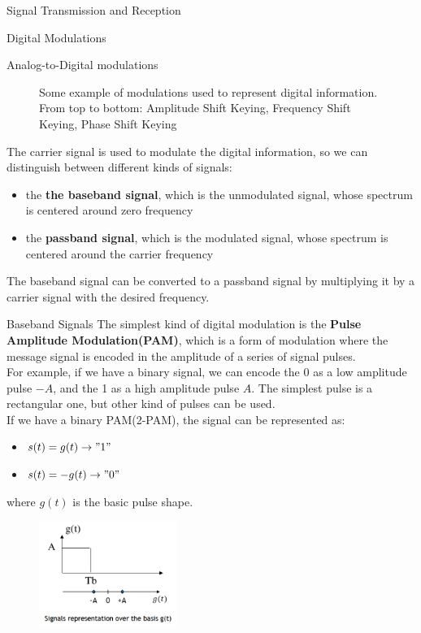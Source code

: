 \begin{section}{Signal Transmission and Reception}
\begin{subsection}{Digital Modulations}
\begin{subsubsection}{Analog-to-Digital modulations}
\begin{figure}[h]
        \caption{Some example of modulations used to represent digital information. From top to bottom:
          Amplitude Shift Keying, Frequency Shift Keying, Phase Shift Keying}
        \label{fig:DigitalModulation}
      \end{figure}
      The carrier signal is used to modulate the digital information, so we can distinguish between
      different kinds of signals:
      \begin{itemize}
        \item the \textbf{the baseband signal}, which is the unmodulated signal, whose spectrum is
          centered around zero frequency
        \item the \textbf{passband signal}, which is the modulated signal, whose spectrum is centered
          around the carrier frequency
      \end{itemize}
      The baseband signal can be converted to a passband signal by multiplying it by a carrier signal
      with the desired frequency.\\
    \end{subsubsection}
    \begin{subsubsection}{Baseband Signals}
      The simplest kind of digital modulation is the \textbf{Pulse Amplitude Modulation(PAM)}, which
      is a form of modulation where the message signal is encoded in the amplitude of a series of
      signal pulses.\\
      For example, if we have a binary signal, we can encode the 0 as a low amplitude pulse $-A$, and the
      1 as a high amplitude pulse $A$. The simplest pulse is a rectangular one, but other kind of 
      pulses can be used.\\
      If we have a binary PAM(2-PAM), the signal can be represented as:
      \begin{itemize}
        \item $s(t)=g(t) \to "1"$
        \item $s(t)=-g(t) \to "0"$
      \end{itemize}
      where $g(t)$ is the basic pulse shape.\\
      \begin{figure}[h]
        \centering
        \includegraphics[width=0.4\textwidth]{img/wireless/2-PAM.png}

\end{figure}
\end{subsubsection}
\end{subsection}
\end{section}
